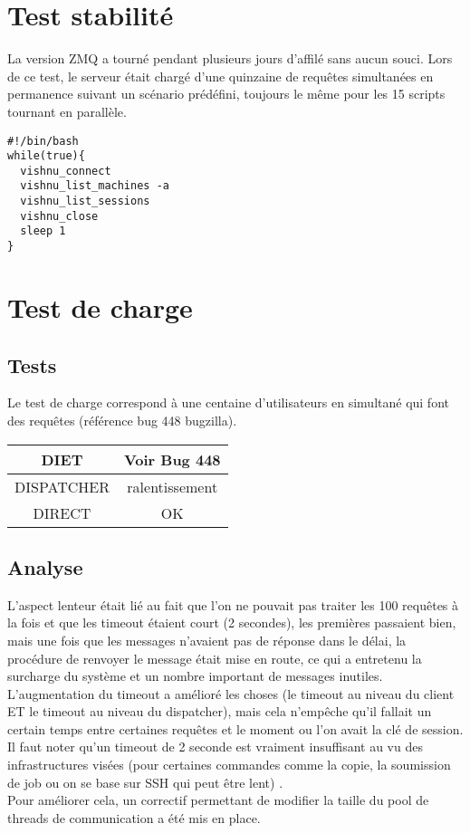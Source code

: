 \documentclass{article}
\begin{document}
\section{Test stabilité}
La version ZMQ a tourné pendant plusieurs jours d'affilé sans aucun souci.
Lors de ce test, le serveur était chargé d'une quinzaine de requêtes
simultanées en permanence suivant un scénario prédéfini, toujours le même 
pour les 15 scripts tournant en parallèle.
\begin{verbatim}
#!/bin/bash
while(true){
  vishnu_connect
  vishnu_list_machines -a
  vishnu_list_sessions
  vishnu_close
  sleep 1
}
\end{verbatim}

\section{Test de charge}
\subsection{Tests}
Le test de charge correspond à une centaine d'utilisateurs en simultané
qui font des requêtes (référence bug 448 bugzilla).

\begin{tabular}{|c|c|}
\hline
DIET & Voir Bug 448 \\
\hline
DISPATCHER & ralentissement \\
\hline
DIRECT & OK \\
\hline
\end{tabular}

\subsection{Analyse}
L'aspect lenteur était lié au fait que l'on ne pouvait pas traiter les 100
requêtes à la fois et que les timeout étaient court (2 secondes), les premières
 passaient bien, mais une fois que les messages n'avaient pas de réponse dans
le délai, la procédure de renvoyer le message était mise en route, ce qui a 
entretenu la surcharge du système et un nombre important de messages inutiles.
L'augmentation du timeout a amélioré les choses (le timeout au niveau du client
ET le timeout au niveau du dispatcher), mais cela n'empêche qu'il fallait un 
certain temps entre certaines requêtes et le moment ou l'on avait la clé de
session. Il faut noter qu'un timeout de 2 seconde est vraiment insuffisant  au vu des infrastructures visées (pour certaines commandes comme la copie, la soumission de job ou on se base sur SSH qui peut être lent) .\\
Pour améliorer cela, un correctif permettant de modifier la taille du pool de 
threads de communication a été mis en place.
\end{document}
